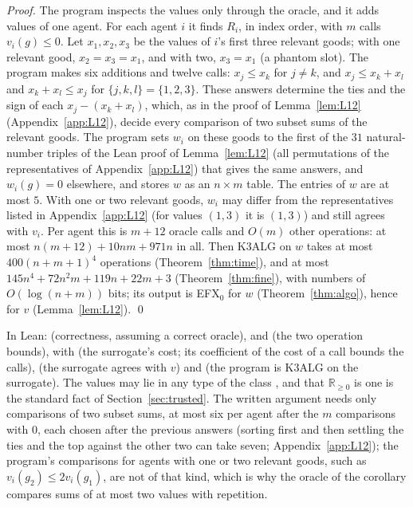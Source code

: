 \documentclass[runningheads,11pt]{llncs}
\newcommand{\efxz}{\texorpdfstring{\mbox{EFX$_0$}}{EFX0}}
\begin{document}
\begin{proof}
The program inspects the values only through the oracle, and it adds values of one agent. For each agent $i$ it finds $R_i$, in index order, with $m$ calls $v_i(g)\le0$. Let $x_1,x_2,x_3$ be the values of $i$'s first three relevant goods; with one relevant good, $x_2=x_3=x_1$, and with two, $x_3=x_1$ (a phantom slot). The program makes six additions and twelve calls: $x_j\le x_k$ for $j\ne k$, and $x_j\le x_k+x_l$ and $x_k+x_l\le x_j$ for $\{j,k,l\}=\{1,2,3\}$. These answers determine the ties and the sign of each $x_j-(x_k+x_l)$, which, as in the proof of Lemma~\ref{lem:L12} (Appendix~\ref{app:L12}), decide every comparison of two subset sums of the relevant goods. The program sets $w_i$ on these goods to the first of the $31$ natural-number triples of the Lean proof of Lemma~\ref{lem:L12} (all permutations of the representatives of Appendix~\ref{app:L12}) that gives the same answers, and $w_i(g)=0$ elsewhere, and stores $w$ as an $n\times m$ table. The entries of $w$ are at most $5$. With one or two relevant goods, $w_i$ may differ from the representatives listed in Appendix~\ref{app:L12} (for values $(1,3)$ it is $(1,3)$) and still agrees with $v_i$. Per agent this is $m+12$ oracle calls and $O(m)$ other operations: at most $n(m+12)+10nm+971n$ in all. Then K3ALG on $w$ takes at most $400(n+m+1)^4$ operations (Theorem~\ref{thm:time}), and at most $145n^4+72n^2m+119n+22m+3$ (Theorem~\ref{thm:fine}), with numbers of $O(\log(n+m))$ bits; its output is \efxz{} for $w$ (Theorem~\ref{thm:algo}), hence for $v$ (Lemma~\ref{lem:L12}). \qed
\end{proof}

\noindent In Lean:  (correctness, assuming a correct oracle),  and  (the two operation bounds), with  (the surrogate's cost; its coefficient of the cost of a call bounds the calls),  (the surrogate agrees with $v$) and  (the program is K3ALG on the surrogate). The values may lie in any type of the class , and that $\mathbb{R}_{\ge0}$ is one is the standard fact of Section~\ref{sec:trusted}. The written argument needs only comparisons of two subset sums, at most six per agent after the $m$ comparisons with $0$, each chosen after the previous answers (sorting first and then settling the ties and the top against the other two can take seven; Appendix~\ref{app:L12}); the program's comparisons for agents with one or two relevant goods, such as $v_i(g_2)\le2v_i(g_1)$, are not of that kind, which is why the oracle of the corollary compares sums of at most two values with repetition.
\end{document}
